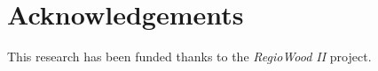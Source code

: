 \documentclass[3p,procedia]{elsarticle}
\begin{document}
\section{Acknowledgements}

This research has been funded thanks to the \textit{RegioWood II} project.

%

\end{document}
